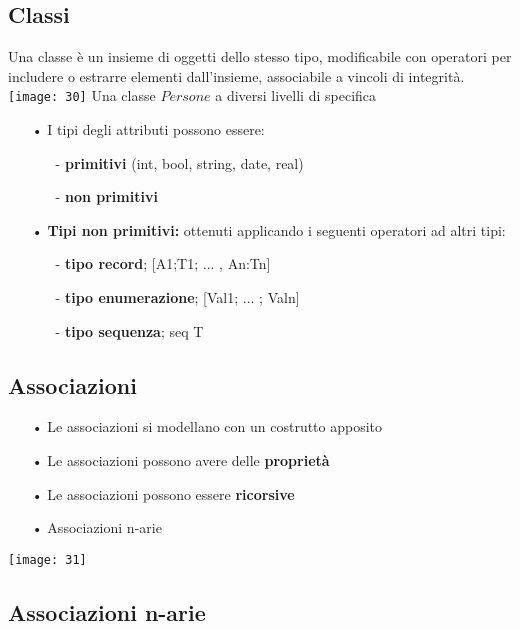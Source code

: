 \documentclass[12pt, letterpaper]{article}
\begin{document}
\subsection{Classi}

Una classe è un insieme di oggetti dello stesso tipo, modificabile con operatori per
includere o estrarre elementi dall’insieme, associabile a vincoli di integrità.
\\
\texttt{[image: 30]}
Una classe \textbf{$Persone$} a diversi livelli di specifica
\\
\begin{itemize}
   \item[•] I tipi degli attributi possono essere:
      \begin{itemize}
         \item[-] \textbf{primitivi} (int, bool, string, date, real)
         \item[-] \textbf{non primitivi}
      \end{itemize}
   \item[•] \textbf{Tipi non primitivi:} ottenuti applicando i seguenti operatori ad altri tipi:
      \begin{itemize}
         \item[-] \textbf{tipo record}; [A1;T1; ... , An:Tn]
         \item[-] \textbf{tipo enumerazione}; [Val1; ... ; Valn]
         \item[-] \textbf{tipo sequenza}; seq T
      \end{itemize}
\end{itemize}

\subsection{Associazioni}

\begin{itemize}
   \item[•] Le associazioni si modellano con un costrutto apposito
   \item[•] Le associazioni possono avere delle \textbf{proprietà}
   \item[•] Le associazioni possono essere \textbf{ricorsive}
   \item[•] Associazioni n-arie
\end{itemize}
\texttt{[image: 31]}

\subsection{Associazioni n-arie}
\end{document}
